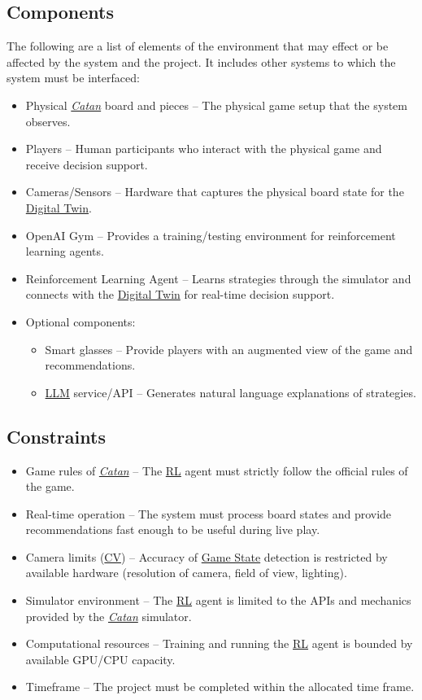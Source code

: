 \documentclass{article}
\newcommand{\Catan}{\href{https://en.wikipedia.org/wiki/Catan}{Catan}}
\newcommand{\RL}{\href{https://www.ibm.com/think/topics/reinforcement-learning}{RL}}
\newcommand{\DigitalTwin}{\href{https://en.wikipedia.org/wiki/Digital_twin}{Digital Twin}}
\newcommand{\CV}{\href{https://www.ibm.com/think/topics/computer-vision}{CV}}
\newcommand{\LLM}{\href{https://www.cloudflare.com/learning/ai/what-is-large-language-model/}{LLM}}
\newcommand{\GameState}{\href{https://milvus.io/ai-quick-reference/what-is-a-state-in-rl}{Game State}}
\begin{document}
\subsection{Components}\label{subsec:components2}
\raggedright The following are a list of elements of the environment that may effect or be affected by the system and the project. It includes other systems to which the system must be interfaced:
\begin{itemize}
    \item {Physical \emph{\Catan{}} board and pieces} – The physical game setup that the system observes.
    \item {Players} – Human participants who interact with the physical game and receive decision support.
    \item {Cameras/Sensors} – Hardware that captures the physical board state for the \DigitalTwin{}.
    \item {OpenAI Gym} – Provides a training/testing environment for reinforcement learning agents.
    \item {Reinforcement Learning Agent} – Learns strategies through the simulator and connects with the \DigitalTwin{} for real-time decision support.
    \item {Optional components:}
    \begin{itemize}
        \item {Smart glasses} – Provide players with an augmented view of the game and recommendations.
        \item {\LLM{} service/API} – Generates natural language explanations of strategies.
    \end{itemize}
\end{itemize}

\subsection{Constraints}\label{subsec:constraints}
\begin{itemize}
    \item {Game rules of \emph{\Catan{}}} – The \RL{} agent must strictly follow the official rules of the game.
    \item {Real-time operation} – The system must process board states and provide recommendations fast enough to be useful during live play.
    \item {Camera limits (\CV{})} – Accuracy of \GameState{} detection is restricted by available hardware (resolution of camera, field of view, lighting).
    \item {Simulator environment} – The \RL{} agent is limited to the APIs and mechanics provided by the \emph{\Catan{}} simulator.
    \item {Computational resources} – Training and running the \RL{} agent is bounded by available GPU/CPU capacity.
    \item {Timeframe} – The project must be completed within the allocated time frame.
\end{itemize}
\end{document}
